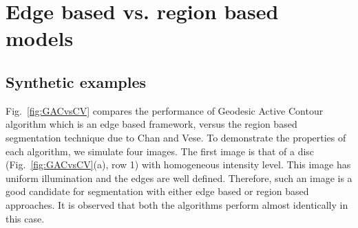 \section{Edge based vs. region based models}

\subsection{Synthetic examples}
Fig.~\ref{fig:GACvsCV} compares the performance of Geodesic Active Contour \cite{caselles_geodesic} algorithm which is an edge based framework, versus the region based segmentation technique due to Chan and Vese\cite{chan_vese}. To demonstrate the properties of each algorithm, we simulate four images. The first image is that of a disc (Fig.~\ref{fig:GACvsCV}(a), row 1) with homogeneous intensity level. This image has uniform illumination and the edges are well defined. Therefore, such an image is a good candidate for segmentation with either edge based or region based approaches. It is observed that both the algorithms perform almost identically in this case.

